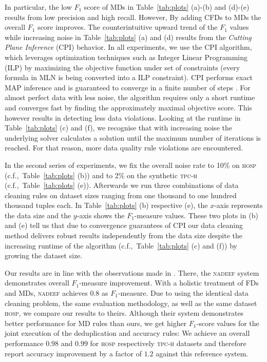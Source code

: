 In particular, the low $F_1$ score of MDs in Table~\ref{tab:plots} (a)-(b) and (d)-(e) results from low precision and high recall. However, By adding CFDs to MDs the overall $F_1$ score improves. The counterintuitive upward trend of the $F_1$ values while increasing noise in Table~\ref{tab:plots} (a) and (d) results from the \textit{Cutting Plane Inference} (CPI) \cite{riedel08improving} behavior. In all experiments, we use the CPI algorithm, which leverages optimization techniques such as Integer Linear Programming (ILP) \cite{riedel08improving, NoessnerNS13} by maximizing the objective function under set of constraints (every formula in MLN is being converted into a ILP constraint). CPI performs exact MAP inference and is guaranteed to converge in a finite number of steps \cite{riedel08improving}. For almost perfect data with less noise, the algorithm requires only a short runtime and converges fast by finding the approximately maximal objective score. This however results in detecting less data violations. Looking at the runtime in Table~\ref{tab:plots} (c) and (f), we recognise that with increasing noise the underlying solver calculates a solution until the maximum number of iterations is reached. For that reason, more data quality rule violations are encountered. 

In the second series of experiments, we fix the overall noise rate to 10\% on \textsc{hosp} (c.f.,~Table~\ref{tab:plots} (b)) and to 2\% on the synthetic \textsc{tpc-h} (c.f.,~Table~\ref{tab:plots} (e)). Afterwards we run three combinations of data cleaning rules on dataset sizes ranging from one thousand to one hundred thousand tuples each. In Table~\ref{tab:plots} (b) respective (e), the $x$-axis represents the data size and the $y$-axis shows the $F_1$-measure values. These two plots in (b) and (e) tell us that due to convergence guarantees of CPI our data cleaning method delivers robust results independently from the data size despite the increasing runtime of the algorithm (c.f.,~Table~\ref{tab:plots} (c) and (f)) by growing the dataset size. 

Our results are in line with the observations made in \cite{Dallachiesa:2013:NCD:2463676.2465327}. There, the \textsc{nadeef} system demonstrates overall $F_1$-measure improvement. With a holistic treatment of FDs and MDs, \textsc{nadeef} achieves $0.8$ as $F_1$-measure. Due to using the identical data cleaning problem, the same evaluation methodology, as well as the same dataset \textsc{hosp}, we compare our results to theirs. Although their system demonstrates better performance for MD rules than ours, we get higher $F_1$-score values for the joint execution of the deduplication and accuracy rules: We achieve an overall performance $0.98$ and $0.99$ for \textsc{hosp} respectively \textsc{tpc-h} datasets and therefore report accuracy improvement by a factor of $1.2$ against this reference system.

